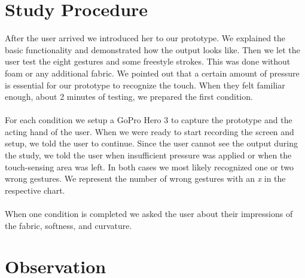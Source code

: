 \section{Study Procedure}
After the user arrived we introduced her to our prototype. We explained the basic functionality and demonstrated how the output looks like. Then we let the user test the eight gestures and some freestyle strokes. This was done without foam or any additional fabric. We pointed out that a certain amount of pressure is essential for our prototype to recognize the touch. When they felt familiar enough, about 2 minutes of testing, we prepared the first condition. 
\\ \\
For each condition we setup a GoPro Hero 3 to capture the prototype and the acting hand of the user. When we were ready to start recording the screen and setup, we told the user to continue. Since the user cannot see the output during the study, we told the user when insufficient  pressure was applied or when the touch-sensing area was left. In both cases we most likely recognized one or two wrong gestures. We represent the number of wrong gestures with an \emph{x} in the respective chart. 
\\ \\
When one condition is completed we asked the user about their impressions of the fabric, softness, and curvature. 

\section{Observation}


